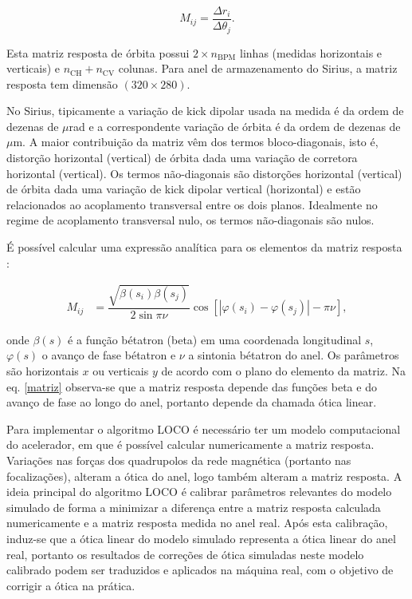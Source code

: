 \begin{equation}
    M_{ij} = \dfrac{\Delta r_i}{\Delta \theta_j}.
\end{equation}

Esta matriz resposta de órbita possui $2 \times n_{\mathrm{BPM}}$ linhas (medidas horizontais e verticais) e $n_\mathrm{{CH}} + n_{\mathrm{CV}}$ colunas. Para anel de armazenamento do Sirius, a matriz resposta tem dimensão $(320 \times 280)$. 

No Sirius, tipicamente a variação de kick dipolar usada na medida é da ordem de dezenas de $\mu$rad e a correspondente variação de órbita é da ordem de dezenas de $\mu$m. A maior contribuição da matriz vêm dos termos bloco-diagonais, isto é, distorção horizontal (vertical) de órbita dada uma variação de corretora horizontal (vertical). Os termos não-diagonais são distorções horizontal (vertical) de órbita dada uma variação de kick dipolar vertical (horizontal) e estão relacionados ao acoplamento transversal entre os dois planos. Idealmente no regime de acoplamento transversal nulo, os termos não-diagonais são nulos.

É possível calcular uma expressão analítica para os elementos da matriz resposta \cite{wiedemann2007particle}:

\begin{align}
M_{ij} &= \dfrac{\sqrt{\beta(s_i)\beta(s_j)}}{2\sin\pi\nu}\cos\left[ |\varphi(s_i) - \varphi(s_j)| - \pi\nu \right],
\label{matriz}
\end{align}

onde $\beta(s)$ é a função bétatron (beta) em uma coordenada longitudinal $s$, $\varphi(s)$ o avanço de fase bétatron e $\nu$ a sintonia bétatron do anel. Os parâmetros são horizontais $x$ ou verticais $y$ de acordo com o plano do elemento da matriz. Na eq. \eqref{matriz} observa-se que a matriz resposta depende das funções beta e do avanço de fase ao longo do anel, portanto depende da chamada ótica linear. 

Para implementar o algoritmo LOCO é necessário ter um modelo computacional do acelerador, em que é possível calcular numericamente a matriz resposta. Variações nas forças dos quadrupolos da rede magnética (portanto nas focalizações), alteram a ótica do anel, logo também alteram a matriz resposta. A ideia principal do algoritmo LOCO é calibrar parâmetros relevantes do modelo simulado de forma a minimizar a diferença entre a matriz resposta calculada numericamente e a matriz resposta medida no anel real. Após esta calibração, induz-se que a ótica linear do modelo simulado representa a ótica linear do anel real, portanto os resultados de correções de ótica simuladas neste modelo calibrado podem ser traduzidos e aplicados na máquina real, com o objetivo de corrigir a ótica na prática. 

